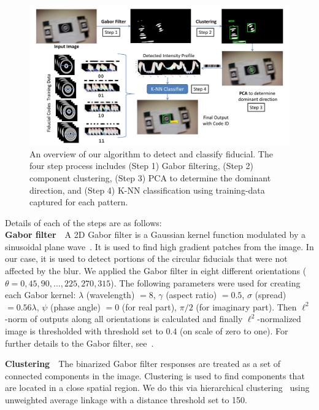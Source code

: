 \documentclass[10pt,twocolumn,letterpaper]{article}
\begin{document}
\begin{figure}[ht!]
\includegraphics[width=\linewidth]{overall_flow.pdf}
\caption{An overview of our algorithm to detect and classify fiducial.
The four step process includes (Step 1) Gabor filtering,
(Step 2) component clustering, (Step 3) PCA to determine the dominant direction,
and (Step 4) K-NN classification using training-data captured for each pattern.}
\label{fig:overall_flow}
\end{figure}

\noindent Details of each of the steps are as follows:\\
\noindent\textbf{Gabor filter}~~A 2D Gabor filter is a Gaussian kernel function
modulated by a sinusoidal plane wave~\cite{Kruizinga:2002}. It is used to find
high gradient patches from the image. In our case, it is used to detect portions
of the circular fiducials that were not affected by the blur. 
We applied the Gabor filter in eight
different orientations ($\theta = 0, 45, 90, \ldots ,225, 270, 315$).  The
following parameters were used for creating each Gabor kernel: $\lambda$ (wavelength) $= 8$, $\gamma$
(aspect ratio) $= 0.5$, $\sigma$ (spread) $= 0.56\lambda$, $\psi$
(phase angle) $= 0$ (for real part), $\pi/2$ (for imaginary part).
Then $\ell^2$-norm of outputs along all orientations is calculated and finally
$\ell^2$-normalized image is thresholded with threshold set to $0.4$ (on scale of zero to
one).  For further details to the Gabor filter, see~\cite{Kruizinga:2002}.

\noindent\textbf{Clustering}~~The binarized Gabor filter responses are
treated as a set of connected components in the image.   Clustering
is used to find components that are located in a close spatial region.  We do
this via hierarchical clustering~\cite{ALGLIB} using unweighted
average linkage with a distance threshold set to 150.
\end{document}
